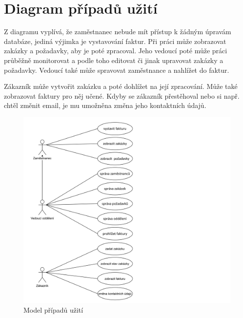 \documentclass[11pt, a4paper]{article}
\begin{document}
	
    \section{Diagram případů užití}
    \qquad Z diagramu vyplívá, že zaměstnanec nebude mít přístup k žádným úpravám databáze, jediná výjimka je vystavování faktur. Při práci může zobrazovat zakázky a požadavky, aby je poté zpracoval. Jeho vedoucí poté může práci průběžně monitorovat a podle toho editovat či jinak upravovat zakázky a požadavky. Vedoucí také může spravovat zaměstnance a nahlížet do faktur.\par
    Zákazník může vytvořit zakázku a poté dohlížet na její zpracování. Může také zobrazovat faktury pro něj učené. Kdyby se zákazník přestěhoval nebo si např. chtěl změnit email, je mu umožněna změna jeho kontaktních údajů.

	\begin{figure}[ht]
		\centering
		\includegraphics[width=1 \linewidth]{use_case_diagram.png}
		\caption{Model případů užití}
	\end{figure}
    \newpage
    
    
\end{document}
